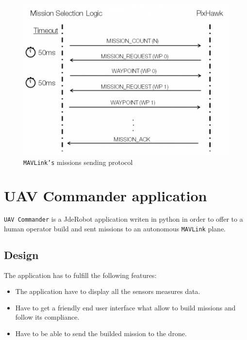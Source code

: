 \documentclass{llncs}
\begin{document}
\begin{figure}[h]
  \centering
  \includegraphics[scale=0.70]{img/waypoint-protocol-sendlist.png}
  \caption{\texttt{MAVLink's} missions sending protocol}
  \label{fig:misiones_mavlink}
\end{figure}


\section{UAV Commander application}

\texttt{UAV Commander} is a JdeRobot application writen in python in order to offer to a human operator build and sent missions to an autonomous \texttt{MAVLink} plane.

\subsection{Design}
\label{design}

The application has to fulfill the following features:
\begin{itemize}
\item The application have to display all the sensors measures data.
\item Have to get a friendly end user interface what allow to build missions and follow its compliance.
\item Have to be able to send the builded mission to the drone.
\end{itemize}
\end{document}
